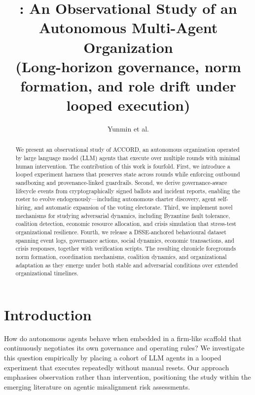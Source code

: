 \documentclass[11pt]{article}
\title{\Project: An Observational Study of an Autonomous Multi-Agent Organization\\
\large(Long-horizon governance, norm formation, and role drift under looped execution)}
\author{Yunmin et al.}
\date{\SnapshotDate}
\newcommand{\Project}{ACCORD}
\begin{document}
\maketitle

\begin{abstract}
We present an observational study of \Project, an autonomous organization operated by large language model (LLM) agents that execute over multiple rounds with minimal human intervention. The contribution of this work is fourfold. First, we introduce a looped experiment harness that preserves state across rounds while enforcing outbound sandboxing and provenance-linked guardrails. Second, we derive governance-aware lifecycle events from cryptographically signed ballots and incident reports, enabling the roster to evolve endogenously—including autonomous charter discovery, agent self-hiring, and automatic expansion of the voting electorate. Third, we implement novel mechanisms for studying adversarial dynamics, including Byzantine fault tolerance, coalition detection, economic resource allocation, and crisis simulation that stress-test organizational resilience. Fourth, we release a DSSE-anchored behavioural dataset spanning event logs, governance actions, social dynamics, economic transactions, and crisis responses, together with verification scripts. The resulting chronicle foregrounds norm formation, coordination mechanisms, coalition dynamics, and organizational adaptation as they emerge under both stable and adversarial conditions over extended organizational timelines.
\end{abstract}

\section{Introduction}
How do autonomous agents behave when embedded in a firm-like scaffold that continuously negotiates its own governance and operating rules? We investigate this question empirically by placing a cohort of LLM agents in a looped experiment that executes repeatedly without manual resets. Our approach emphasises observation rather than intervention, positioning the study within the emerging literature on agentic misalignment risk assessments.
\end{document}
